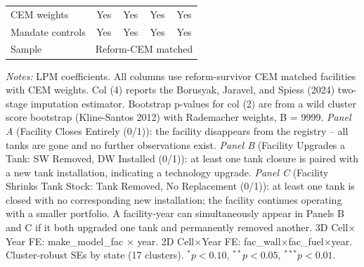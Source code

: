 \begin{table}[htbp]
\begin{tabular}{lcccc}
CEM weights            & Yes & Yes & Yes & Yes \\
Mandate controls       & Yes & Yes & Yes & Yes \\
Sample & \multicolumn{4}{c}{Reform-CEM matched} \\
\bottomrule
\end{tabular}
\begin{minipage}{\linewidth}
\small
\textit{Notes:} LPM coefficients. All columns use reform-survivor CEM matched facilities with CEM weights. Col (4) reports the Borusyak, Jaravel, and Spiess (2024) two-stage imputation estimator. Bootstrap p-values for col (2) are from a wild cluster score bootstrap (Kline-Santos 2012) with Rademacher weights, B = 9999. \textit{Panel A} (Facility Closes Entirely (0/1)): the facility disappears from the registry -- all tanks are gone and no further observations exist. \textit{Panel B} (Facility Upgrades a Tank: SW Removed, DW Installed (0/1)): at least one tank closure is paired with a new tank installation, indicating a technology upgrade. \textit{Panel C} (Facility Shrinks Tank Stock: Tank Removed, No Replacement (0/1)): at least one tank is closed with no corresponding new installation; the facility continues operating with a smaller portfolio. A facility-year can simultaneously appear in Panels B and C if it both upgraded one tank and permanently removed another. 3D Cell$\times$Year FE: make\_model\_fac $\times$ year. 2D Cell$\times$Year FE: fac\_wall$\times$fac\_fuel$\times$year. Cluster-robust SEs by state (17 clusters). $^{*}p<0.10$, $^{**}p<0.05$, $^{***}p<0.01$.
\end{minipage}
\end{table}
